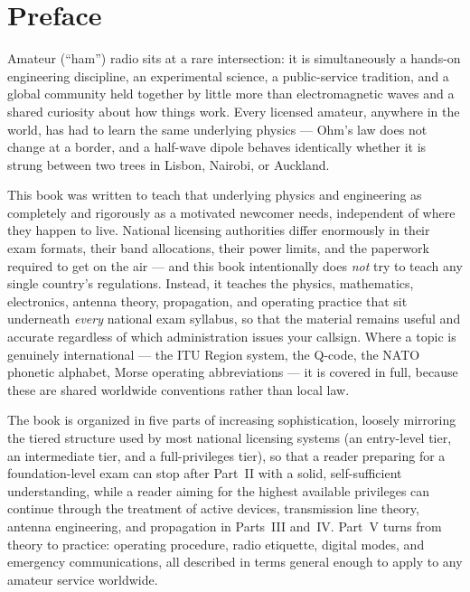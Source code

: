 \chapter*{Preface}

Amateur (``ham'') radio sits at a rare intersection: it is simultaneously a
hands-on engineering discipline, an experimental science, a public-service
tradition, and a global community held together by little more than
electromagnetic waves and a shared curiosity about how things work. Every
licensed amateur, anywhere in the world, has had to learn the same
underlying physics --- Ohm's law does not change at a border, and a
half-wave dipole behaves identically whether it is strung between two trees
in Lisbon, Nairobi, or Auckland.

This book was written to teach that underlying physics and engineering as
completely and rigorously as a motivated newcomer needs, independent of
where they happen to live. National licensing authorities differ enormously
in their exam formats, their band allocations, their power limits, and the
paperwork required to get on the air --- and this book intentionally does
\emph{not} try to teach any single country's regulations. Instead, it
teaches the physics, mathematics, electronics, antenna theory, propagation,
and operating practice that sit underneath \emph{every} national exam
syllabus, so that the material remains useful and accurate regardless of
which administration issues your callsign. Where a topic is genuinely
international --- the ITU Region system, the Q-code, the NATO phonetic
alphabet, Morse operating abbreviations --- it is covered in full, because
these are shared worldwide conventions rather than local law.

The book is organized in five parts of increasing sophistication, loosely
mirroring the tiered structure used by most national licensing systems
(an entry-level tier, an intermediate tier, and a full-privileges tier),
so that a reader preparing for a foundation-level exam can stop after
Part~II with a solid, self-sufficient understanding, while a reader aiming
for the highest available privileges can continue through the treatment of
active devices, transmission line theory, antenna engineering, and
propagation in Parts~III and~IV. Part~V turns from theory to practice:
operating procedure, radio etiquette, digital modes, and emergency
communications, all described in terms general enough to apply to any
amateur service worldwide.


